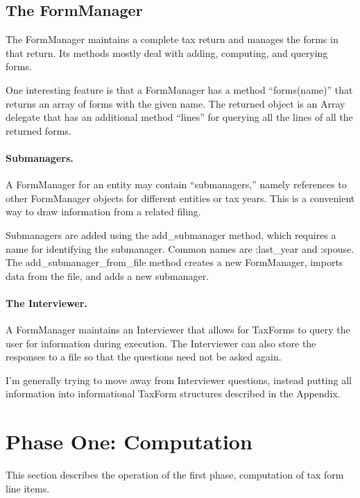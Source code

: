 \documentclass[12pt]{article}
\begin{document}
\subsection{The FormManager}

The FormManager maintains a complete tax return and manages the forms in that
return. Its methods mostly deal with adding, computing, and querying forms.

One interesting feature is that a FormManager has a method ``forms(name)'' that
returns an array of forms with the given name. The returned object is an Array
delegate that has an additional method ``lines'' for querying all the lines of
all the returned forms.

\paragraph{Submanagers.}
A FormManager for an entity may contain ``submanagers,'' namely
references to other FormManager objects for different entities or tax years.
This is a convenient way to draw information from a related filing.

Submanagers are added using the add\_submanager method, which requires a name
for identifying the submanager. Common names are :last\_year and :spouse. The
add\_submanager\_from\_file method creates a new FormManager, imports data from
the file, and adds a new submanager.

\paragraph{The Interviewer.} A FormManager maintains an Interviewer that allows
for TaxForms to query the user for information during execution. The Interviewer
can also store the responses to a file so that the questions need not be asked
again.

I'm generally trying to move away from Interviewer questions, instead putting
all information into informational TaxForm structures described in the Appendix.


\section{Phase One: Computation}

This section describes the operation of the first phase, computation of tax form
line items.
\end{document}
